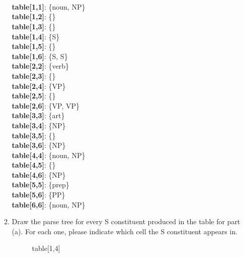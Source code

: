 \documentclass[11pt]{article}
\begin{document}
\begin{enumerate}
\begin{enumerate}
{{}
}
\\\\\\

\textbf{table[1,1]}: \{noun, NP\}\\
\textbf{table[1,2]}: \{\}\\
\textbf{table[1,3]}: \{\}\\
\textbf{table[1,4]}: \{S\}\\
\textbf{table[1,5]}: \{\}\\
\textbf{table[1,6]}: \{S, S\}\\
\textbf{table[2,2]}: \{verb\}\\
\textbf{table[2,3]}: \{\}\\
\textbf{table[2,4]}: \{VP\}\\
\textbf{table[2,5]}: \{\}\\
\textbf{table[2,6]}: \{VP, VP\}\\
\textbf{table[3,3]}: \{art\}\\
\textbf{table[3,4]}: \{NP\}\\
\textbf{table[3,5]}: \{\}\\
\textbf{table[3,6]}: \{NP\}\\
\textbf{table[4,4]}: \{noun, NP\}\\
\textbf{table[4,5]}: \{\}\\
\textbf{table[4,6]}: \{NP\}\\
\textbf{table[5,5]}: \{prep\}\\
\textbf{table[5,6]}: \{PP\}\\
\textbf{table[6,6]}: \{noun, NP\}\\


\newpage

\item Draw the parse tree for every S constituent produced in the
  table for part (a). For each one, please indicate which cell the S constituent appears in.
  
\begin{figure}[h]
\begin{minipage}[b]{1.0\linewidth}
\centering
{}
\caption{table[1,4]}
\end{minipage}
\end{figure}


\end{enumerate}
\end{enumerate}
\end{document}
